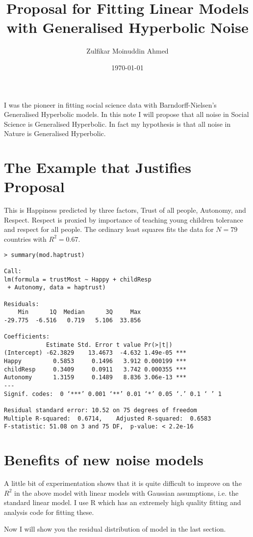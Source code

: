 \documentclass{amsart}
\title{Proposal for Fitting Linear Models with Generalised Hyperbolic Noise}
\author{Zulfikar Moinuddin Ahmed}
\date{\today}
\begin{document}
\maketitle
I was the pioneer in fitting social science data with Barndorff-Nielsen's Generalised Hyperbolic models.  In this note I will propose that all noise in Social Science is Generalised Hyperbolic.  In fact my hypothesis is that all noise in Nature is Generalised Hyperbolic.  

\section{The Example that Justifies Proposal}

This is Happiness predicted by three factors, Trust of all people, Autonomy, and Respect.  Respect is proxied by importance of teaching young children tolerance and respect for all people.  The ordinary least squares fits the data for $N=79$ countries with $R^2=0.67$.

\begin{verbatim}
> summary(mod.haptrust)

Call:
lm(formula = trustMost ~ Happy + childResp
 + Autonomy, data = haptrust)

Residuals:
    Min      1Q  Median      3Q     Max 
-29.775  -6.516   0.719   5.106  33.856 

Coefficients:
            Estimate Std. Error t value Pr(>|t|)    
(Intercept) -62.3829    13.4673  -4.632 1.49e-05 ***
Happy         0.5853     0.1496   3.912 0.000199 ***
childResp     0.3409     0.0911   3.742 0.000355 ***
Autonomy      1.3159     0.1489   8.836 3.06e-13 ***
---
Signif. codes:  0 ‘***’ 0.001 ‘**’ 0.01 ‘*’ 0.05 ‘.’ 0.1 ‘ ’ 1

Residual standard error: 10.52 on 75 degrees of freedom
Multiple R-squared:  0.6714,	Adjusted R-squared:  0.6583 
F-statistic: 51.08 on 3 and 75 DF,  p-value: < 2.2e-16
\end{verbatim}

\section{Benefits of new noise models}
A little bit of experimentation shows that it is quite difficult to improve on the $R^2$ in the above model with linear models with Gaussian assumptions, i.e. the standard linear model.  I use R which has an extremely high quality fitting and analysis code for fitting these.  

Now I will show you the residual distribution of model in the last section.
\end{document}
